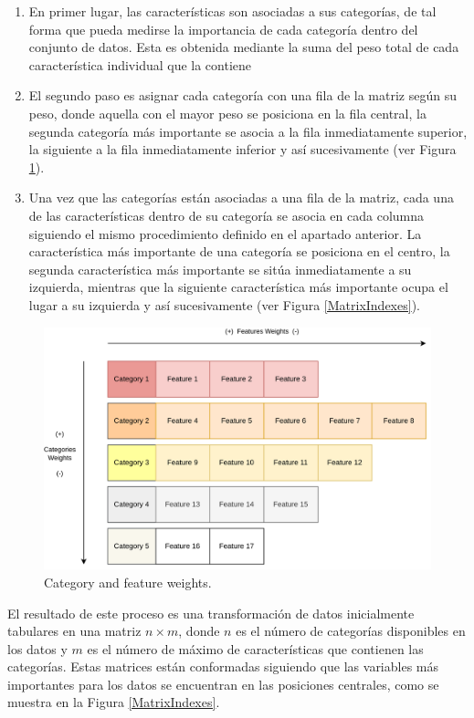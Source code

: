 \documentclass{uathesis-es}
\begin{document}
{	\begin{enumerate}
		\item En primer lugar, las características son asociadas a sus categorías, de tal forma que pueda medirse la importancia de cada categoría dentro del conjunto de datos. Esta es obtenida mediante la suma del peso total de cada característica individual que la contiene
		\item El segundo paso es asignar cada categoría con una fila de la matriz según su peso, donde aquella con el mayor peso se posiciona en la fila central, la segunda categoría más importante se asocia a la fila inmediatamente superior, la siguiente a la fila inmediatamente inferior y así sucesivamente (ver Figura \ref{CategoriesFeaturesWeights}).
		\item Una vez que las categorías están asociadas a una fila de la matriz, cada una de las características dentro de su categoría se asocia en cada columna siguiendo el mismo procedimiento definido en el apartado anterior. La característica más importante de una categoría se posiciona en el centro, la segunda característica más importante se sitúa inmediatamente a su izquierda, mientras que la siguiente característica más importante ocupa el lugar a su izquierda y así sucesivamente (ver Figura \ref{MatrixIndexes}).
	\end{enumerate}
	
	
	\begin{figure}[H]
		\centering
		\includegraphics[width=14cm]{Figures/indexing_positions_1_2.png}
		\caption{Category and feature weights.}
		\label{CategoriesFeaturesWeights}
	\end{figure}
	
	El resultado de este proceso es una transformación de datos inicialmente tabulares en una matriz $n \times m$, donde $n$ es el número de categorías disponibles en los datos y $m$ es el número de máximo de características que contienen las categorías. Estas matrices están conformadas siguiendo que las variables más importantes para los datos se encuentran en las posiciones centrales, como se muestra en la Figura \ref{MatrixIndexes}.
	
}
\end{document}
